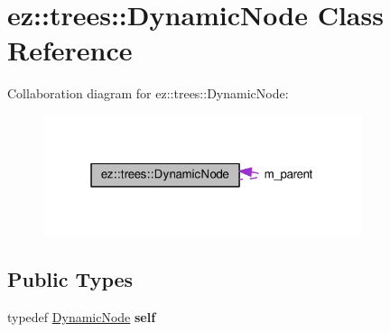 \hypertarget{classez_1_1trees_1_1DynamicNode}{}\section{ez\+:\+:trees\+:\+:Dynamic\+Node Class Reference}
\label{classez_1_1trees_1_1DynamicNode}


Collaboration diagram for ez\+:\+:trees\+:\+:Dynamic\+Node\+:
\nopagebreak
\begin{figure}[H]
\begin{center}
\leavevmode
\includegraphics[width=265pt]{classez_1_1trees_1_1DynamicNode__coll__graph}
\end{center}
\end{figure}
\subsection*{Public Types}
\begin{DoxyCompactItemize}
\item 
\mbox{\label{classez_1_1trees_1_1DynamicNode_aafafeeedfad803ab01c6a7eb5c5c0eb7}} 
typedef \hyperlink{classez_1_1trees_1_1DynamicNode}{Dynamic\+Node} {\bfseries self}
\end{DoxyCompactItemize}
